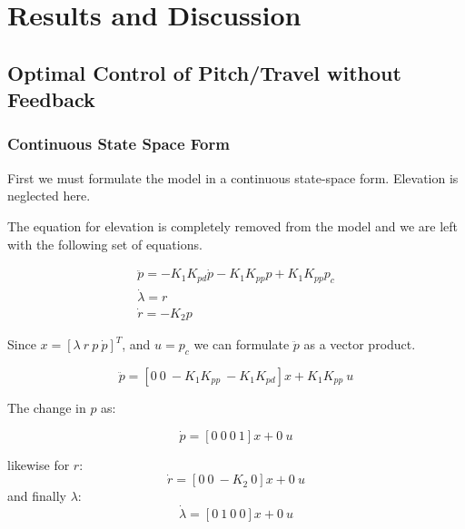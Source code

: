 \newcommand{\texMacro}[2]{\texttt{\textbackslash{#1}\{#2\}}}
\section{Results and Discussion}
\subsection{Optimal Control of Pitch/Travel without Feedback}

\subsubsection{Continuous State Space Form}
First we must formulate the model  in a continuous state-space form. Elevation is neglected here.

The equation for elevation  is completely removed from the model  and we are left with the following set of equations.

\begin{subequations}
	\begin{align}
		\ddot{p} = - K_1K_{pd}\dot{p} - K_1K_{pp}p + K_1K_{pp}p_c \\
		\dot{\lambda} = r \\
		\dot{r} = -K_2p
	\end{align}
\end{subequations}

Since $ x = [\lambda\ r\ p\ \dot{p}]^T $, and $ u = p_c $ we can formulate $\ddot{p}$ as a vector product.

\begin{equation}
	\ddot{p} = [0\ 0\ -K_1K_{pp}\ -K_1K_{pd}] x + K_1K_{pp}\ u
\end{equation}

The change in $ p $ as:

\begin{equation}
\dot{p} = [0\ 0\ 0\ 1] x + 0\ u
\end{equation}

likewise for $ r $:
\begin{equation}
	\dot{r} = [0\ 0\ -K_2\ 0] x + 0\ u
\end{equation}
and finally $\lambda$:
\begin{equation}
	\dot{\lambda} = [0\ 1\ 0\ 0] x + 0\ u
\end{equation}


